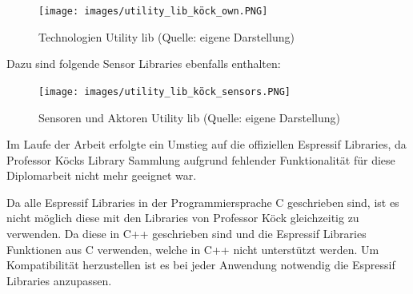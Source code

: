 \begin{figure}[H]
    \begin{center}
        \texttt{[image: images/utility\_lib\_köck\_own.PNG]}
        \caption{Technologien Utility lib (Quelle: eigene Darstellung)}
    \end{center}
\end{figure}

\pagebreak
Dazu sind folgende Sensor Libraries ebenfalls enthalten:

\begin{figure}[H]
    \begin{center}
        \texttt{[image: images/utility\_lib\_köck\_sensors.PNG]}
        \caption{Sensoren und Aktoren Utility lib (Quelle: eigene Darstellung)}
    \end{center}
\end{figure}

Im Laufe der Arbeit erfolgte ein Umstieg auf die offiziellen Espressif Libraries, da Professor Köcks Library Sammlung aufgrund fehlender Funktionalität für diese Diplomarbeit nicht mehr geeignet war.

Da alle Espressif Libraries in der Programmiersprache C geschrieben sind, ist es nicht möglich diese mit den Libraries von Professor Köck gleichzeitig zu verwenden. Da diese in C++ geschrieben sind und die Espressif Libraries Funktionen aus C verwenden, welche in C++ nicht unterstützt werden. Um Kompatibilität herzustellen ist es bei jeder Anwendung notwendig die Espressif Libraries anzupassen.